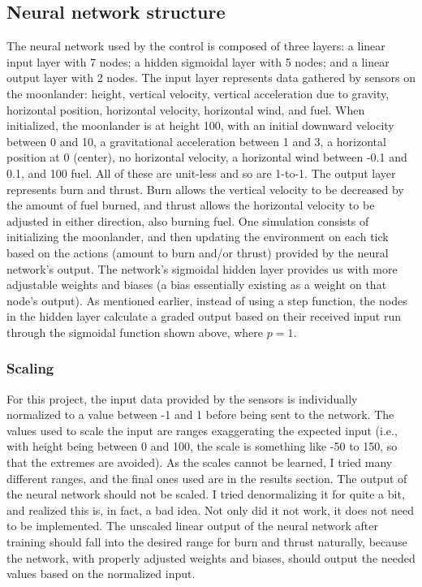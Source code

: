 \documentclass[12pt, article]{scrartcl}
\begin{document}
\subsection{Neural network structure}
The neural network used by the control is composed of three layers: a linear input layer with 7 nodes; a hidden sigmoidal layer with 5 nodes; and a linear output layer with 2 nodes. The input layer represents data gathered by sensors on the moonlander: height, vertical velocity, vertical acceleration due to gravity, horizontal position, horizontal velocity, horizontal wind, and fuel. When initialized, the moonlander is at height 100, with an initial downward velocity between 0 and 10, a gravitational acceleration between 1 and 3, a horizontal position at 0 (center), no horizontal velocity, a horizontal wind between -0.1 and 0.1, and 100 fuel. All of these are unit-less and so are 1-to-1. The output layer represents burn and thrust. Burn allows the vertical velocity to be decreased by the amount of fuel burned, and thrust allows the horizontal velocity to be adjusted in either direction, also burning fuel. One simulation consists of initializing the moonlander, and then updating the environment on each tick based on the actions (amount to burn and/or thrust) provided by the neural network's output. The network's sigmoidal hidden layer provides us with more adjustable weights and biases (a bias essentially existing as a weight on that node's output). As mentioned earlier, instead of using a step function, the nodes in the hidden layer calculate a graded output based on their received input run through the sigmoidal function shown above, where $p=1$.
\subsubsection{Scaling}
For this project, the input data provided by the sensors is individually normalized to a value between -1 and 1 before being sent to the network. The values used to scale the input are ranges exaggerating the expected input (i.e., with height being between 0 and 100, the scale is something like -50 to 150, so that the extremes are avoided). As the scales cannot be learned, I tried many different ranges, and the final ones used are in the results section. The output of the neural network should not be scaled. I tried denormalizing it for quite a bit, and realized this is, in fact, a bad idea. Not only did it not work, it does not need to be implemented. The unscaled linear output of the neural network after training should fall into the desired range for burn and thrust naturally, because the network, with properly adjusted weights and biases, should output the needed values based on the normalized input.
\end{document}
